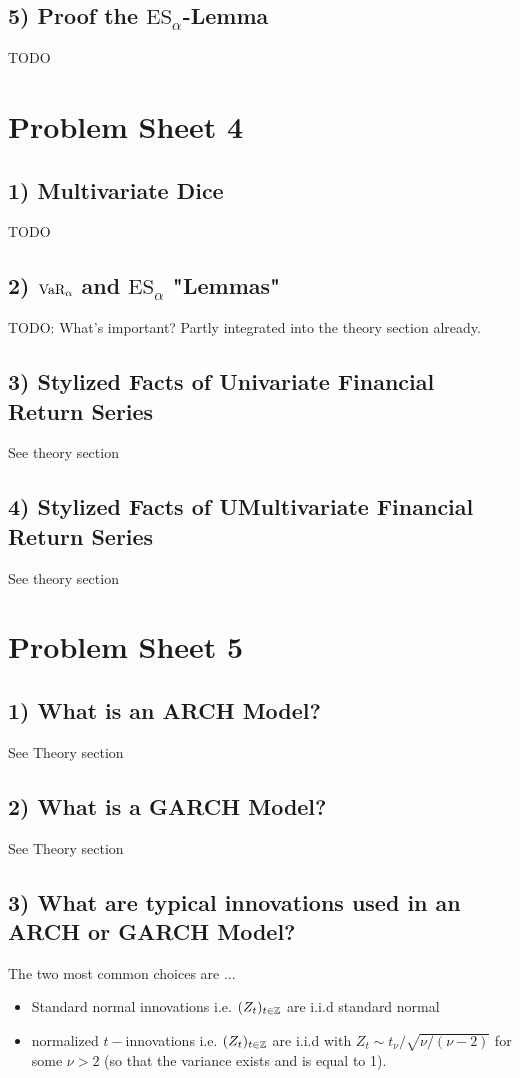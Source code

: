 %
%
\subsection*{5) Proof the $\text{ES}_\alpha$-Lemma} TODO


%
%
\section*{Problem Sheet 4}
\subsection*{1) Multivariate Dice} TODO
\subsection*{2) $\text{VaR}_\alpha$ and $\text{ES}_\alpha$ "Lemmas"} TODO: What's important? Partly integrated into the theory section already.
\subsection*{3) Stylized Facts of Univariate Financial Return Series} See theory section
\subsection*{4) Stylized Facts of UMultivariate Financial Return Series} See theory section

%
%
\section*{Problem Sheet 5}
%
%
\subsection*{1) What is an ARCH Model?} See Theory section

%
%
\subsection*{2) What is a GARCH Model?} See Theory section

%
%
\subsection*{3) What are typical innovations used in an ARCH or GARCH Model?}
The two most common choices are ...
\begin{itemize}
    \item Standard normal innovations i.e. $(Z_t)_{t\in\mathbb{Z}}$ are i.i.d standard normal
    \item normalized $t-$innovations i.e. $(Z_t)_{t\in\mathbb{Z}}$ are i.i.d with $Z_t \sim t_\nu / \sqrt{\nu/(\nu-2)}$ for some $\nu > 2$ (so that the variance exists and is equal to 1).
\end{itemize}

